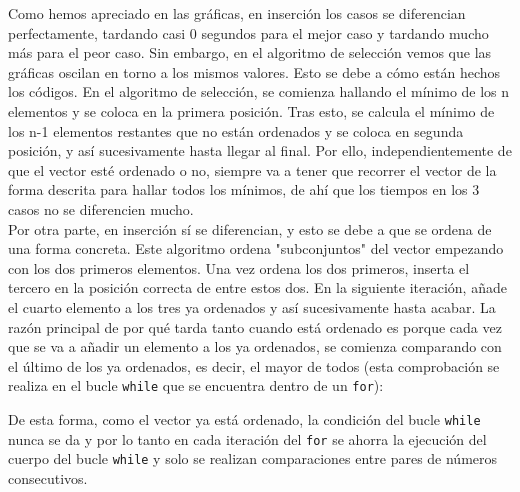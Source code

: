 \documentclass[10pt,a4paper]{article}
\begin{document}
Como hemos apreciado en las gráficas, en inserción los casos se diferencian perfectamente, tardando casi 0 segundos para el mejor caso y tardando mucho más para el peor caso. Sin embargo, en el algoritmo de selección vemos que las gráficas oscilan en torno a los mismos valores. Esto se debe a cómo están hechos los códigos. En el algoritmo de selección, se comienza hallando el mínimo de los n elementos y se coloca en la primera posición. Tras esto, se calcula el mínimo de los n-1 elementos restantes que no están ordenados y se coloca en segunda posición, y así sucesivamente hasta llegar al final. Por ello, independientemente de que el vector esté ordenado o no, siempre va a tener que recorrer el vector de la forma descrita para hallar todos los mínimos, de ahí que los tiempos en los 3 casos no se diferencien mucho.\\

Por otra parte, en inserción sí se diferencian, y esto se debe a que se ordena de una forma concreta. Este algoritmo ordena "subconjuntos" del vector empezando con los dos primeros elementos. Una vez ordena los dos primeros, inserta el tercero en la posición correcta de entre estos dos. En la siguiente iteración, añade el cuarto elemento a los tres ya ordenados y así sucesivamente hasta acabar. La razón principal de por qué tarda tanto cuando está ordenado es porque cada vez que se va a añadir un elemento a los ya ordenados, se comienza comparando con el último de los ya ordenados, es decir, el mayor de todos (esta comprobación se realiza en el bucle \texttt{while} que se encuentra dentro de un \texttt{for}):



De esta forma, como el vector ya está ordenado, la condición del bucle \texttt{while} nunca se da y por lo tanto en cada iteración del \texttt{for} se ahorra la ejecución del cuerpo del bucle \texttt{while} y solo se realizan comparaciones entre pares de números consecutivos.
\end{document}
